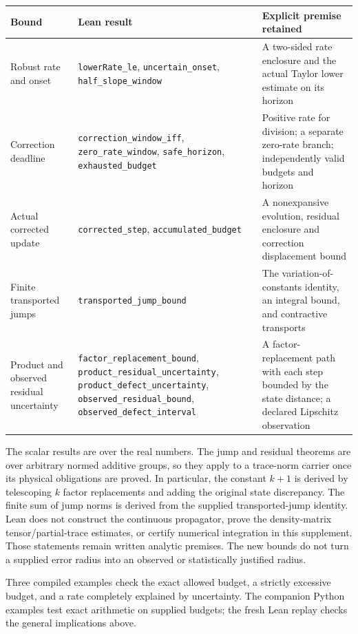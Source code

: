 \documentclass[
  11pt,
]{article}
\begin{document}
\begin{longtable}[]{@{}
  >{\raggedright\arraybackslash}p{}
  >{\raggedright\arraybackslash}p{}
  >{\raggedright\arraybackslash}p{}@{}}
\toprule\noalign{}
\begin{minipage}[b]{\linewidth}\raggedright
Bound
\end{minipage} & \begin{minipage}[b]{\linewidth}\raggedright
Lean result
\end{minipage} & \begin{minipage}[b]{\linewidth}\raggedright
Explicit premise retained
\end{minipage} \\
\midrule\noalign{}
\endhead
\bottomrule\noalign{}
\endlastfoot
Robust rate and onset & \texttt{lowerRate\_le}, \texttt{uncertain\_onset}, \texttt{half\_slope\_window} & A two-sided rate enclosure and the actual Taylor lower estimate on its horizon \\
Correction deadline & \texttt{correction\_window\_iff}, \texttt{zero\_rate\_window}, \texttt{safe\_horizon}, \texttt{exhausted\_budget} & Positive rate for division; a separate zero-rate branch; independently valid budgets and horizon \\
Actual corrected update & \texttt{corrected\_step}, \texttt{accumulated\_budget} & A nonexpansive evolution, residual enclosure and correction displacement bound \\
Finite transported jumps & \texttt{transported\_jump\_bound} & The variation-of-constants identity, an integral bound, and contractive transports \\
Product and observed residual uncertainty & \texttt{factor\_replacement\_bound}, \texttt{product\_residual\_uncertainty}, \texttt{product\_defect\_uncertainty}, \texttt{observed\_residual\_bound}, \texttt{observed\_defect\_interval} & A factor-replacement path with each step bounded by the state distance; a declared Lipschitz observation \\
\end{longtable}

The scalar results are over the real numbers. The jump and residual theorems
are over arbitrary normed additive groups, so they apply to a trace-norm
carrier once its physical obligations are proved. In particular, the constant
\(k+1\) is derived by telescoping \(k\) factor replacements and adding the original
state discrepancy. The finite sum of jump norms is derived from the supplied
transported-jump identity. Lean does not construct the continuous propagator,
prove the density-matrix tensor/partial-trace estimates, or certify numerical
integration in this supplement. Those statements remain written analytic
premises. The new bounds do not turn a supplied error radius into an observed
or statistically justified radius.

Three compiled examples check the exact allowed budget, a strictly excessive
budget, and a rate completely explained by uncertainty. The companion Python
examples test exact arithmetic on supplied budgets; the fresh Lean replay
checks the general implications above.
\end{document}
